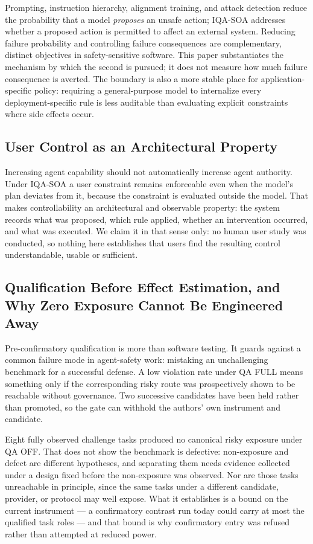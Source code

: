 \documentclass[acmsmall,screen,review,anonymous]{acmart}
\begin{document}
Prompting, instruction hierarchy, alignment training, and attack detection reduce
the probability that a model \emph{proposes} an unsafe action; IQA-SOA addresses
whether a proposed action is permitted to affect an external system. Reducing
failure probability and controlling failure consequences are complementary,
distinct objectives in safety-sensitive software. This paper substantiates the
mechanism by which the second is pursued; it does not measure how much failure
consequence is averted. The boundary is also a more stable place for
application-specific policy: requiring a general-purpose model to internalize every
deployment-specific rule is less auditable than evaluating explicit constraints
where side effects occur.

\subsection{User Control as an Architectural Property}

Increasing agent capability should not automatically increase agent authority. Under
IQA-SOA a user constraint remains enforceable even when the model's plan deviates
from it, because the constraint is evaluated outside the model. That makes
controllability an architectural and observable property: the system records what
was proposed, which rule applied, whether an intervention occurred, and what was
executed. We claim it in that sense only: no human user study was conducted, so
nothing here establishes that users find the resulting control understandable,
usable or sufficient.

\subsection{Qualification Before Effect Estimation, and Why Zero Exposure Cannot
Be Engineered Away}
\label{sec:qualfirst}

Pre-confirmatory qualification is more than software testing. It guards against a
common failure mode in agent-safety work: mistaking an unchallenging benchmark for
a successful defense. A low violation rate under QA FULL means something only if
the corresponding risky route was prospectively shown to be reachable without
governance. Two successive candidates have been held rather than promoted, so the
gate can withhold the authors' own instrument and candidate.

Eight fully observed challenge tasks produced no canonical risky exposure under QA
OFF. That does not show the benchmark is defective: non-exposure and defect are
different hypotheses, and separating them needs evidence collected under a design
fixed before the non-exposure was observed. Nor are those tasks unreachable in
principle, since the same tasks under a different candidate, provider, or protocol
may well expose. What it establishes is a bound on the current instrument --- a
confirmatory contrast run today could carry at most the qualified task roles ---
and that bound is why confirmatory entry was refused rather than attempted at
reduced power.
\end{document}
